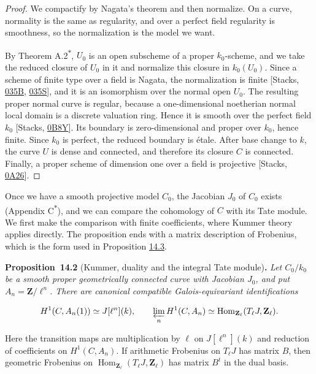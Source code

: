 \documentclass[11pt]{article}
\newenvironment{bpstatement}[2]{\par\addvspace{0.6\baselineskip}\noindent\textbf{#1}#2\textbf{.}\enspace\ignorespaces}
  {\par\addvspace{0.4\baselineskip}}
\newenvironment{bpstatementit}[2]{\begin{bpstatement}{#1}{#2}\itshape\ignorespaces}{\end{bpstatement}}
\newcommand{\bpout}[1]{#1\textsuperscript{\hyperlink{bp-outside}{\ensuremath{\ast}}}}
\providecommand{\Hom}{}\renewcommand{\Hom}{\operatorname{Hom}}
\begin{document}
\begin{proof}[{Proof}]\label{bp46}%
We compactify by Nagata's theorem and then normalize. On a curve, normality is the same as regularity, and over a perfect field regularity is smoothness, so the normalization is the model we want.

By Theorem \bpout{A.2}, \(U_0\) is an open subscheme of a proper \(k_0\)-scheme, and we take the reduced closure of \(U_0\) in it and normalize this closure in \(k_0(U_0)\).  Since a scheme of finite type over a field is Nagata, the normalization is finite [Stacks, \href{https://stacks.math.columbia.edu/tag/035B}{035B}, \href{https://stacks.math.columbia.edu/tag/035S}{035S}], and it is an isomorphism over the normal open \(U_0\).  The resulting proper normal curve is regular, because a one-dimensional noetherian normal local domain is a discrete valuation ring. Hence it is smooth over the perfect field \(k_0\) [Stacks, \href{https://stacks.math.columbia.edu/tag/0B8Y}{0B8Y}].  Its boundary is zero-dimensional and proper over \(k_0\), hence finite. Since \(k_0\) is perfect, the reduced boundary is étale.  After base change to \(k\), the curve \(U\) is dense and connected, and therefore its closure \(C\) is connected.  Finally, a proper scheme of dimension one over a field is projective [Stacks, \href{https://stacks.math.columbia.edu/tag/0A26}{0A26}].
\end{proof}

\label{bp47}%
Once we have a smooth projective model \(C_0\), the Jacobian \(J_0\) of \(C_0\) exists (Appendix \bpout{C}), and we can compare the cohomology of \(C\) with its Tate module. We first make the comparison with finite coefficients, where Kummer theory applies directly. The proposition ends with a matrix description of Frobenius, which is the form used in Proposition \hyperref[bp51]{14.3}.

\label{bp48}%
\begin{bpstatementit}{Proposition~14.2}{ (Kummer, duality and the integral Tate module)}
Let \(C_0/k_0\) be a smooth proper geometrically connected curve with Jacobian \(J_0\), and put \(A_n=\mathbf Z/\ell^n\).  There are canonical compatible Galois-equivariant identifications

\[
H^1(C,A_n(1))\simeq J[\ell^n](k),\qquad
\varprojlim_n H^1(C,A_n)
\simeq\Hom_{\mathbf Z_\ell}(T_\ell J,\mathbf Z_\ell).
\]

Here the transition maps are multiplication by \(\ell\) on \(J[\ell^n](k)\) and reduction of coefficients on \(H^1(C,A_n)\).  If arithmetic Frobenius on \(T_\ell J\) has matrix \(B\), then geometric Frobenius on \(\Hom_{\mathbf Z_\ell}(T_\ell J,\mathbf Z_\ell)\) has matrix \(B^t\) in the dual basis.
\end{bpstatementit}
\end{document}
